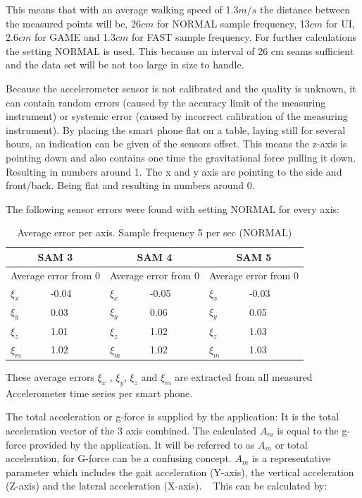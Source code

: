 This means that with an average walking speed of 1.3$m/s$ the distance between the measured points will be, 26$cm$ for NORMAL sample frequency, 13$cm$ for UI, 2.6$cm$ for GAME and 1.3$cm$ for FAST sample frequency. 
For further calculations the setting NORMAL is used. This because an interval of 26 cm seams sufficient and the data set will be not too large in size to handle. 

Because the accelerometer sensor is not calibrated and the quality is unknown, it can contain random errors (caused by the accuracy limit of the measuring instrument) or systemic error (caused by incorrect calibration of the measuring instrument). 
By placing the smart phone flat on a table, laying still for several hours, an indication can be given of the sensors offset. This means the z-axis is pointing down and also contains one time the gravitational force pulling it down. Resulting in numbers around 1. The x and y axis are pointing to the side and front/back. Being flat and resulting in numbers around 0.

The following sensor errors were found with setting NORMAL for every axis:

\renewcommand{\arraystretch}{1.5}
\renewcommand{\tabcolsep}{0.2cm}
\begin{table}[h]
\centering
\caption{Average error per axis. Sample frequency 5 per sec (NORMAL)}
\label{averageerror}
\begin{tabular}{|l|l|l|l|l|l|} 
\hline
\multicolumn{2}{|c|}{SAM 3} & \multicolumn{2}{|c|}{SAM 4} & \multicolumn{2}{|c|}{SAM 5} \\
\hline
\multicolumn{2}{|c|}{Average error from 0} & \multicolumn{2}{|c|}{Average error from 0} & \multicolumn{2}{|c|}{Average error from 0} \\ 
\hline
$\xi_{x}$ & -0.04 &$\xi_{x}$ & -0.05 &$\xi_{x}$ & -0.03 \\
$\xi_{y}$ & 0.03 & $\xi_{y}$ & 0.06 & $\xi_{y}$ & 0.05 \\
$\xi_{z}$ & 1.01 & $\xi_{z}$ & 1.02 & $\xi_{z}$ & 1.03 \\
$\xi_{m}$ & 1.02 & $\xi_{m}$ & 1.02 & $\xi_{m}$ & 1.03 \\
\hline
\end{tabular}
\end{table}

These average errors $\xi_{x}$ , $\xi_{y}$, $\xi_{z}$ and $\xi_{m}$ are extracted from all measured Accelerometer time series per smart phone. 

The total acceleration or g-force is supplied by the application: It is the total acceleration vector of the 3 axis combined. The calculated $A_{m}$ is equal to the g-force provided by the application. It will be referred to as $A_{m}$ or total acceleration, for G-force can be a confusing concept. $A_{m}$ is a representative parameter which includes the gait acceleration (Y-axis), the vertical acceleration (Z-axis) and the lateral acceleration (X-axis). ~\cite{Weiss2014}
This can be calculated by:

